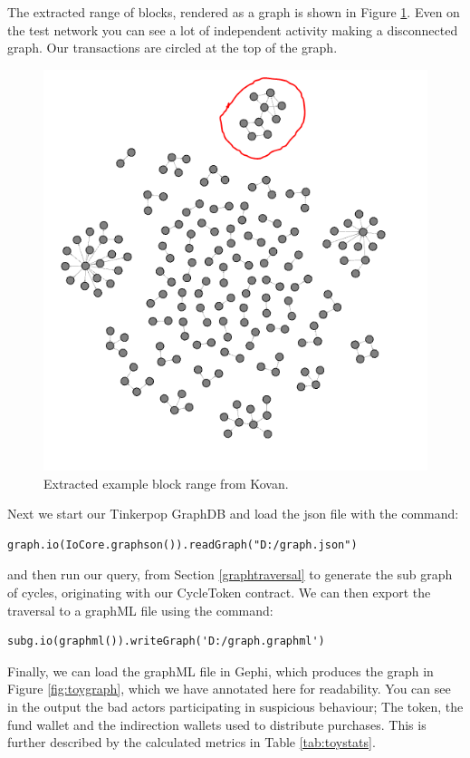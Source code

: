 \documentclass[conference]{IEEEtran}
\begin{document}
The extracted range of blocks, rendered as a graph is shown in Figure \ref{fig:toyfullgraph}.  Even on the test network you can see a lot of independent activity making a disconnected graph.  Our transactions are circled at the top of the graph.



\begin{figure}
    \centering
    \includegraphics[width=0.6\columnwidth]{images/toy_full_graph.png}
    \caption{Extracted example block range from Kovan.}
    \label{fig:toyfullgraph}
\end{figure}

Next we start our Tinkerpop GraphDB and load the json file with the command:

\begin{lstlisting}[basicstyle=\tiny]
graph.io(IoCore.graphson()).readGraph("D:/graph.json")
\end{lstlisting}

and then run our query, from Section \ref{graphtraversal} to generate the sub graph of cycles, originating with our CycleToken contract.  We can then export the traversal to a graphML file using the command:

\begin{lstlisting}[basicstyle=\tiny]
subg.io(graphml()).writeGraph('D:/graph.graphml')
\end{lstlisting}

Finally, we can load the graphML file in Gephi, which produces the graph in Figure \ref{fig:toygraph}, which we have annotated here for readability.  You can see in the output the bad actors participating in suspicious behaviour; The token, the fund wallet and the indirection wallets used to distribute purchases.  This is further described by the calculated metrics in Table \ref{tab:toystats}.
\end{document}
